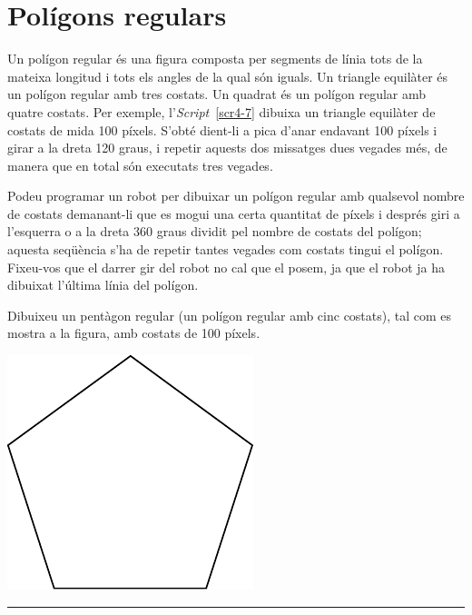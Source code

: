 \section{Polígons regulars}
Un polígon regular és una figura composta per segments de línia tots de la mateixa longitud i tots els angles de la qual són iguals. Un triangle equilàter és un polígon regular amb tres costats. Un quadrat és un polígon regular amb quatre costats. Per exemple, l'\emph{Script}~\ref{scr4-7} dibuixa un triangle equilàter de costats de mida 100 píxels. S'obté dient-li a \textsf{pica} d'anar endavant 100 píxels i girar a la dreta 120 graus, i repetir aquests dos missatges dues vegades més, de manera que en total són executats tres vegades.

Podeu programar un robot per dibuixar un polígon regular amb qualsevol nombre de costats demanant-li que es mogui una certa quantitat de píxels i després giri a l'esquerra o a la dreta 360 graus dividit pel nombre de costats del polígon; aquesta seqüència s'ha de repetir tantes vegades com costats tingui el polígon. Fixeu-vos que el darrer gir del robot no cal que el posem, ja que el robot ja ha dibuixat l'última línia del polígon.

\begin{center}
\colorbox{black}{}
\end{center}
{\small
\noindent
Dibuixeu un pentàgon regular (un polígon regular amb cinc costats), tal com es mostra a la figura, amb costats de 100 píxels.}
\begin{center}
\includegraphics[scale=0.9]{Imatges/figuraE4-9.pdf}
\end{center}
\noindent
\rule{\textwidth}{3pt}

